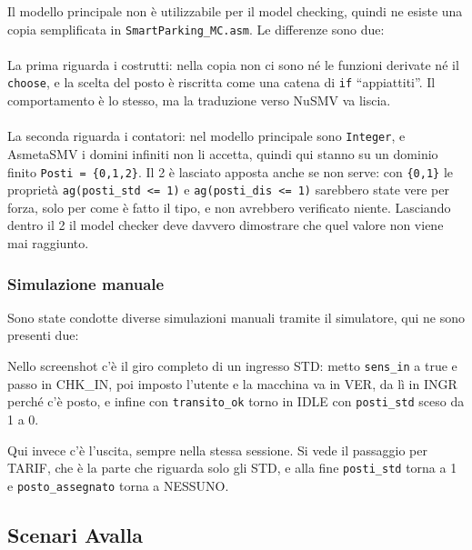Il modello principale non è utilizzabile per il model checking, quindi ne esiste una
copia semplificata in \texttt{SmartParking\_MC.asm}. Le differenze sono due:
\\ \\
La prima riguarda i costrutti: nella copia non ci sono né le funzioni derivate né il
\texttt{choose}, e la scelta del posto è riscritta come una catena di \texttt{if}
``appiattiti''. Il comportamento è lo stesso, ma la traduzione verso NuSMV va liscia.
\\ \\
La seconda riguarda i contatori: nel modello principale sono \texttt{Integer}, e
AsmetaSMV i domini infiniti non li accetta, quindi qui stanno su un dominio finito
\texttt{Posti = \{0,1,2\}}. Il 2 è lasciato apposta anche se non serve: con
\texttt{\{0,1\}} le proprietà \texttt{ag(posti\_std <= 1)} e
\texttt{ag(posti\_dis <= 1)} sarebbero state vere per forza, solo per come è fatto il
tipo, e non avrebbero verificato niente. Lasciando dentro il 2 il model checker deve
davvero dimostrare che quel valore non viene mai raggiunto.

\subsubsection{Simulazione manuale}
Sono state condotte diverse simulazioni manuali tramite il simulatore, qui ne sono presenti due:

Nello screenshot c'è il giro completo di un ingresso STD: metto \texttt{sens\_in} a true
e passo in CHK\_IN, poi imposto l'utente e la macchina va in VER, da lì in INGR perché
c'è posto, e infine con \texttt{transito\_ok} torno in IDLE con \texttt{posti\_std} sceso
da 1 a 0.


Qui invece c'è l'uscita, sempre nella stessa sessione. Si vede il passaggio per TARIF,
che è la parte che riguarda solo gli STD, e alla fine \texttt{posti\_std} torna a 1 e
\texttt{posto\_assegnato} torna a NESSUNO.




\newpage
\subsection{Scenari Avalla}

